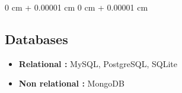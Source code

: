 \documentclass[10pt, letterpaper]{article}
\newenvironment{highlights}{
  \begin{itemize}[
    topsep=0.10 cm,
    parsep=0.10 cm,
    partopsep=0pt,
    itemsep=0pt,
    leftmargin=0 cm + 10pt
  ]
}{
  \end{itemize}
} %
\newenvironment{onecolentry}{
  \begin{adjustwidth}{
    0 cm + 0.00001 cm
  }{
    0 cm + 0.00001 cm
  }
}{
  \end{adjustwidth}
} %
\begin{document}
\begin{onecolentry}
\subsection{Databases}

\begin{highlights}
\item \textbf{Relational :} MySQL, PostgreSQL, SQLite

\item \textbf{Non relational :} MongoDB

\end{highlights}

\end{onecolentry}

\vspace{0.2 cm}
\end{document}

